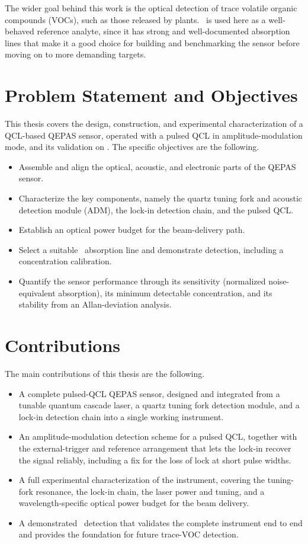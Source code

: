 The wider goal behind this work is the optical detection of trace volatile organic compounds (VOCs), such as those released by plants. \nto\ is used here as a well-behaved reference analyte, since it has strong and well-documented absorption lines that make it a good choice for building and benchmarking the sensor before moving on to more demanding targets.

\section{Problem Statement and Objectives}
\label{sec:objectives}

This thesis covers the design, construction, and experimental characterization of a QCL-based QEPAS sensor, operated with a pulsed QCL in amplitude-modulation mode, and its validation on \nto. The specific objectives are the following.
\begin{itemize}
  \item Assemble and align the optical, acoustic, and electronic parts of the QEPAS sensor.
  \item Characterize the key components, namely the quartz tuning fork and acoustic detection module (ADM), the lock-in detection chain, and the pulsed QCL.
  \item Establish an optical power budget for the beam-delivery path.
  \item Select a suitable \nto\ absorption line and demonstrate detection, including a concentration calibration.
  \item Quantify the sensor performance through its sensitivity (normalized noise-equivalent absorption), its minimum detectable concentration, and its stability from an Allan-deviation analysis.
\end{itemize}

\section{Contributions}
\label{sec:contributions}

The main contributions of this thesis are the following.
\begin{itemize}
  \item A complete pulsed-QCL QEPAS sensor, designed and integrated from a tunable quantum cascade laser, a quartz tuning fork detection module, and a lock-in detection chain into a single working instrument.
  \item An amplitude-modulation detection scheme for a pulsed QCL, together with the external-trigger and reference arrangement that lets the lock-in recover the signal reliably, including a fix for the loss of lock at short pulse widths.
  \item A full experimental characterization of the instrument, covering the tuning-fork resonance, the lock-in chain, the laser power and tuning, and a wavelength-specific optical power budget for the beam delivery.
  \item A demonstrated \nto\ detection that validates the complete instrument end to end and provides the foundation for future trace-VOC detection.
\end{itemize}

